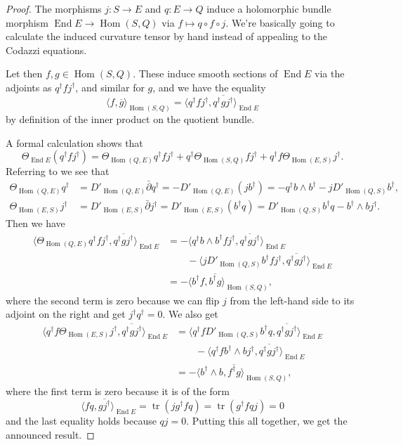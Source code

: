 \documentclass[10pt,a4paper]{article}
\newtheorem*{proof}{Proof}
\def\ov#1{\overline{#1}}
\DeclareMathOperator{\End}{End}
\DeclareMathOperator{\Hom}{Hom}
\DeclareMathOperator{\tr}{tr}
\begin{document}
\begin{proof}
The morphisms $j : S \to E$ and $q : E \to Q$ induce a holomorphic bundle morphism $\End E \to \Hom(S,Q)$ via $f \mapsto q \circ f \circ j$. We're basically going to calculate the induced curvature tensor by hand instead of appealing to the Codazzi equations.

Let then $f,g \in \Hom(S,Q)$. These induce smooth sections of $\End E$ via the adjoints as $q^\dagger f j^\dagger$, and similar for $g$, and we have the equality
\[
\langle f, \ov g \rangle_{\Hom(S,Q)}
= \langle q^\dagger f j^\dagger, \ov{q^\dagger g j^\dagger} \rangle_{\End E}
\]
by definition of the inner product on the quotient bundle.

A formal calculation shows that
\[
\Theta_{\End E} (q^\dagger f j^\dagger)
= \Theta_{\Hom(Q,E)} q^\dagger f j^\dagger
+ q^\dagger \Theta_{\Hom(S,Q)} f j^\dagger
+ q^\dagger f \Theta_{\Hom(E,S)} j^\dagger.
\]
Referring to  we see that
\begin{align*}
\Theta_{\Hom(Q,E)} q^\dagger
&= D'_{\Hom(Q,E)} \bar\partial q^\dagger
= -D'_{\Hom(Q,E)} (j b^\dagger)
= -q^\dagger b \wedge b^\dagger - j D'_{\Hom(Q,S)}b^\dagger,
\\
\Theta_{\Hom(E,S)} j^\dagger
&= D'_{\Hom(E,S)} \bar\partial j^\dagger
= D'_{\Hom(E,S)}(b^\dagger q)
= D'_{\Hom(Q,S)}b^\dagger q - b^\dagger \wedge b j^\dagger.
\end{align*}
Then we have
\begin{align*}
\langle \Theta_{\Hom(Q,E)} q^\dagger f j^\dagger, \ov{q^\dagger g j^\dagger} \rangle_{\End E}
&= -\langle q^\dagger b \wedge b^\dagger f j^\dagger, \ov{q^\dagger g j^\dagger} \rangle_{\End E}
\\
&\qquad - \langle j D'_{\Hom(Q,S)}b^\dagger f j^\dagger, \ov{q^\dagger g j^\dagger} \rangle_{\End E}
\\
&= -\langle b^\dagger f, \ov{b^\dagger g} \rangle_{\Hom(S,Q)},
\end{align*}
where the second term is zero because we can flip $j$ from the left-hand side to its adjoint on the right and get $j^\dagger q^\dagger = 0$. We also get
\begin{align*}
\langle q^\dagger f \Theta_{\Hom(E,S)} j^\dagger, \ov{q^\dagger g j^\dagger} \rangle_{\End E}
&= \langle q^\dagger f D'_{\Hom(Q,S)}b^\dagger q , \ov{q^\dagger g j^\dagger} \rangle_{\End E}
\\
&\qquad
- \langle q^\dagger f b^\dagger \wedge b j^\dagger, \ov{q^\dagger g j^\dagger} \rangle_{\End E}
\\
&= - \langle b^\dagger \wedge b, \ov{f^\dagger g} \rangle_{\Hom(S,Q)},
\end{align*}
where the first term is zero because it is of the form
\[
\langle f q, \ov{g j^\dagger} \rangle_{\End E}
= \tr(j g^\dagger f q)
= \tr(g^\dagger f q j) = 0
\]
and the last equality holds because $q j = 0$.
Putting this all together, we get the announced result.
\end{proof}
\end{document}
